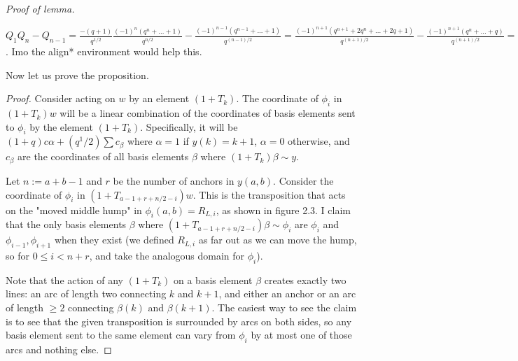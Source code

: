 \documentclass{amsart}
\begin{document}
\textit{Proof of lemma.}

$Q_1Q_n-Q_{n-1}=\frac{-(q+1)}{q^{1/2}}\frac{(-1)^n(q^n+...+1)}{q^{n/2}}-\frac{(-1)^{n-1}(q^{n-1}+...+1)}{q^{(n-1)/2}}=\frac{(-1)^{n+1}(q^{n+1}+2q^n+...+2q+1)}{q^{(n+1)/2}}-\frac{(-1)^{n+1}(q^n+...+q)}{q^{(n+1)/2}}=\frac{(-1)^{n+1}(q^{n+1}+...+1)}{q^{(n+1)/2}}=Q_{n+1}$.
{\color{magenta} Imo the align* environment would help this.}

Now let us prove the proposition.

\begin{proof}
	Consider acting on $w$ by an element $(1+T_k)$. The coordinate of $\phi_i$ in $(1+T_k)w$ will be a linear combination of the coordinates of basis elements sent to $\phi_i$ by the element $(1+T_k)$. Specifically, it will be $(1+q)c\alpha+(q^1/2)\sum c_\beta$ where $\alpha=1$ if $y(k)=k+1$, $\alpha=0$ otherwise, and $c_\beta$ are the coordinates of all basis elements $\beta$ where $(1+T_k)\beta\sim y$.
	
	Let $n:=a+b-1$ and $r$ be the number of anchors in $y(a,b)$. Consider the coordinate of $\phi_i$ in $(1+T_{a-1+r+n/2-i})w$. This is the transposition that acts on the "moved middle hump" in $\phi_i(a,b)=R_{L,i}$, as shown in figure 2.3. I claim that the only basis elements $\beta$ where $(1+T_{a-1+r+n/2-i})\beta\sim \phi_i$ are $\phi_i$ and $\phi_{i-1},\phi_{i+1}$ when they exist (we defined $R_{L,i}$ as far out as we can move the hump, so for $0\leq i<n+r$, and take the analogous domain for $\phi_i$).
	
	Note that the action of any $(1+T_k)$ on a basis element $\beta$ creates exactly two lines: an arc of length two connecting $k$ and $k+1$, and either an anchor or an arc of length $\geq 2$ connecting $\beta(k)$ and $\beta(k+1)$. The easiest way to see the claim is to see that the given transposition is surrounded by arcs on both sides, so any basis element sent to the same element can vary from $\phi_i$ by at most one of those arcs and nothing else. 
	

\end{proof}
\end{document}
